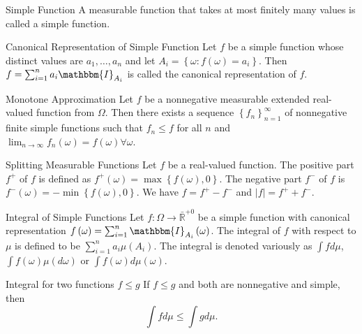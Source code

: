 \documentclass[avery5371,grid]{flashcards}
\begin{document}
\begin{flashcard}[Definition]{Simple Function}
 A measurable function that takes at most finitely many values is called a simple
 function.
\end{flashcard}

\begin{flashcard}[Definition]{Canonical Representation of Simple Function}
Let $f$ be a simple function whose distinct values are $a_1, \ldots, a_n$ and let
$A_i = \left\{ \omega : f\left( \omega \right) = a_i \right\}$. Then 
$f = \sum_{i=1}^n a_i \mathbbm{I}_{A_i}$ is called the canonical representation of
$f$. 
\end{flashcard}

\begin{flashcard}[Lemma]{Monotone Approximation}
 Let $f$ be a nonnegative measurable extended real-valued function from $\Omega$. Then there exists
 a sequence $\left\{ f_n \right\}_{n=1}^\infty$ of nonnegative finite simple functions
 such that $f_n \le f$ for all $n$ and $\lim_{n \to \infty} f_n\left( \omega \right) = f\left( \omega \right) \forall \omega$.
\end{flashcard}

\begin{flashcard}[Definition]{Splitting Measurable Functions}
Let $f$ be a real-valued function. The positive part $f^+$ of $f$ is defined as
$f^+\left( \omega \right) = \max \left\{ f\left( \omega \right), 0\right\}$. The negative part
$f^-$ of $f$ is $f^-\left( \omega \right)=-\min\left\{ f\left( \omega \right), 0 \right\}$. We have
$f = f^+ - f^-$ and $|f| = f^+ + f^-$.
\end{flashcard}

\begin{flashcard}[Definition]{Integral of Simple Functions}
 Let $f : \Omega \to \bar{\mathbb{R}}^{+0}$ be a simple function with canonical 
 representation $f\left( \omega \right) = \sum_{i=1}^n \mathbbm{I}_{A_i}\left( \omega \right)$.
 The integral of $f$ with respect to $\mu$ is defined to be $\sum_{i=1}^n a_i \mu\left( A_i \right)$. The integral is denoted
 variously as $\int f d\mu$, $\int f\left( \omega \right) \mu\left( d\omega \right)$ or
 $\int f\left( \omega \right) d\mu\left( \omega \right)$.
\end{flashcard}

\begin{flashcard}[Proposition]{Integral for two functions $f \le g$}
If $f \le g$ and both are nonnegative and simple, then 
\[
\int f d\mu \le \int g d\mu.
\]
\end{flashcard}
\end{document}
